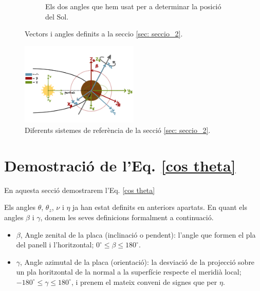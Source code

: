 \documentclass[11pt]{article}
\begin{document}
\begin{figure}[hbt]
\begin{subfigure}{0.5\textwidth}
        \caption{Els dos angles que hem usat per a determinar la posició del Sol.}
        \label{fig: sist_sol}
    \end{subfigure}
\label{fig: sistemes1}
\caption{Vectors i angles definits a la seccio \ref{sec: seccio_2}.}
\end{figure}

\begin{figure}[hbt]
    \centering
    \includegraphics[width=0.5\textwidth]{sist_ref.PNG}
    \caption{Diferents sistemes de referència de la secció \ref{sec: seccio_2}.}
    \label{fig: sist_ref}
\end{figure}

\section{Demostració de l'Eq. \eqref{cos theta}}
\label{sec: demo cos theta}
En aquesta secció demostrarem l'Eq. \eqref{cos theta}

Els angles $\theta$, $\theta_z$, $\nu$ i $\eta$ ja han estat definits en anteriors apartats. En quant els angles $\beta$ i $\gamma$, donem les seves definicions formalment a continuació.
\begin{itemize}
    \item $\beta$, Angle zenital de la placa (inclinació o pendent): l'angle que formen el pla del panell i l'horitzontal; $0^\circ \leq \beta \leq 180^\circ$.
    \item $\gamma$, Angle azimutal de la placa (orientació): la desviació de la projecció sobre un pla horitzontal de la normal a la superfície respecte el meridià local; $-180^\circ \leq \gamma \leq 180^\circ$, i prenem el mateix conveni de signes que per $\eta$.
\end{itemize}
\end{document}
